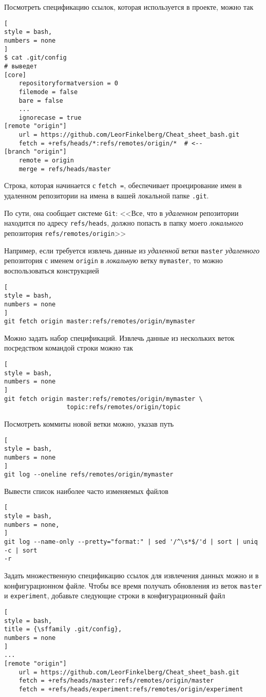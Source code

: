 \documentclass[%
	11pt,
	a4paper,
	utf8,
		]{article}
\begin{document}
Посмотреть спецификацию ссылок, которая используется в проекте, можно так
\begin{lstlisting}[
style = bash,
numbers = none
]
$ cat .git/config
# выведет
[core]
    repositoryformatversion = 0
    filemode = false
    bare = false
    ...
    ignorecase = true
[remote "origin"]
    url = https://github.com/LeorFinkelberg/Cheat_sheet_bash.git
    fetch = +refs/heads/*:refs/remotes/origin/*  # <--
[branch "origin"]
    remote = origin
    merge = refs/heads/master
\end{lstlisting}

Строка, которая начинается с \texttt{fetch =}, обеспечивает проецирование имен в удаленном репозитории на имена в вашей локальной папке \texttt{.git}.

По сути, она сообщает системе \texttt{Git}: <<Все, что в \emph{удаленном} репозитории находится по адресу \verb|refs/heads|, должно попасть в папку моего \emph{локального} репозитория \verb|refs/remotes/origin|>>

Например, если требуется извлечь данные из \emph{удаленной} ветки \texttt{master} \emph{удаленного} репозитория с именем \texttt{origin} в \emph{локальную} ветку \texttt{mymaster}, то можно воспользоваться конструкцией
\begin{lstlisting}[
style = bash,
numbers = none
]
git fetch origin master:refs/remotes/origin/mymaster
\end{lstlisting}

Можно задать набор спецификаций. Извлечь данные из нескольких веток посредством командой строки можно так
\begin{lstlisting}[
style = bash,
numbers = none
]
git fetch origin master:refs/remotes/origin/mymaster \
                 topic:refs/remotes/origin/topic
\end{lstlisting}

Посмотреть коммиты новой ветки можно, указав путь 
\begin{lstlisting}[
style = bash,
numbers = none
]
git log --oneline refs/remotes/origin/mymaster
\end{lstlisting}

Вывести список наиболее часто изменяемых файлов
\begin{lstlisting}[
style = bash,
numbers = none,
]
git log --name-only --pretty="format:" | sed '/^\s*$/'d | sort | uniq -c | sort
-r
\end{lstlisting}

Задать множественную спецификацию ссылок для извлечения данных можно и в конфигурационном файле. Чтобы все время получать обновления из веток \texttt{master} и \texttt{experiment}, добавьте следующие строки в конфигурационный файл
\begin{lstlisting}[
style = bash,
title = {\sffamily .git/config},
numbers = none
]
...
[remote "origin"]
    url = https://github.com/LeorFinkelberg/Cheat_sheet_bash.git
    fetch = +refs/heads/master:refs/remotes/origin/master
    fetch = +refs/heads/experiment:refs/remotes/origin/experiment
\end{lstlisting}
\end{document}
